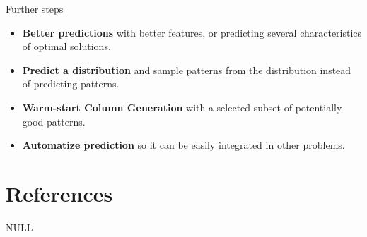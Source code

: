 \documentclass[usenames,dvipsnames]{beamer}
\begin{document}
\begin{frame}{Further steps}
\protect\hypertarget{further-steps}{}

\begin{itemize}[<+->]

\item
  \textbf{Better predictions} with better features, or predicting
  several characteristics of optimal solutions.
\item
  \textbf{Predict a distribution} and sample patterns from the
  distribution instead of predicting patterns.
\item
  \textbf{Warm-start Column Generation} with a selected subset of
  potentially good patterns.
\item
  \textbf{Automatize prediction} so it can be easily integrated in other
  problems.
\end{itemize}

\end{frame}

\begin{frame}

\end{frame}

\hypertarget{references}{%
\section{References}\label{references}}

NULL
\end{document}

